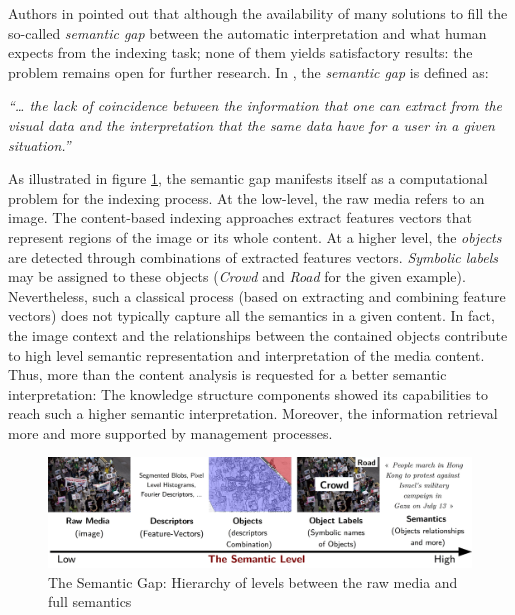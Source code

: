 	Authors in \citep{Hauptmann2007,Wang2008,Hauptmann2007a,Kompatsiaris2008,Darwish2015,Ves2015} 
	pointed out that although the availability of many solutions to fill the so-called \emph{semantic gap} \citep{Hare2006}
	between the automatic interpretation and what human expects from the indexing task; 
	none of them yields satisfactory results:  the problem remains open for further research. 
	In \citep{Smeulders2000}, the \emph{semantic gap} is defined as:

	\begin{mydef}
	\textit{``\dots{} the lack of coincidence between the information that one can extract from the visual 
	data and the interpretation that the same data have for a user in a given situation.''}
	\end{mydef}
	
	As illustrated in figure \ref{introduction_2}, the semantic gap manifests itself as a computational 
	problem for the indexing process.  At the low-level, the raw media refers to an image.%
	The content-based indexing approaches extract features vectors that represent regions of 
	the image or its whole content. At a higher level, the \emph{objects} are detected through combinations
	of extracted features vectors. \emph{Symbolic labels} may be assigned to these objects (\emph{Crowd} and 
	\emph{Road} for the given example). Nevertheless, such a classical process (based on extracting and 
	combining feature vectors) does not typically capture all the semantics in a given content. In fact, 
	the image context and the relationships between the contained objects contribute to  high 
	level  semantic representation and interpretation of the media content.
	Thus, more than the content analysis is
	requested for a better semantic interpretation: The knowledge structure components showed its capabilities to 
	reach such a higher semantic interpretation. Moreover, the information retrieval  more and more supported by
	 management processes.


	\begin{figure}[ht!]
		\centering
		\includegraphics[scale=0.75]{figures/introduction_2.pdf}
		\caption{The Semantic Gap: Hierarchy of levels between the raw media and full semantics}
		\label{introduction_2}
	\end{figure}

